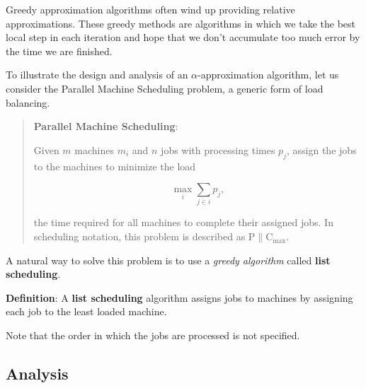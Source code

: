 \documentclass{article}
\begin{document}
Greedy approximation algorithms often wind up providing relative
approximations.  These greedy methods are algorithms in which we take
the best local step in each iteration and hope that we don't
accumulate too much error by the time we are finished.

% 
% 

To illustrate the design and analysis of an $\alpha$-approximation algorithm,
let us consider the Parallel Machine Scheduling problem, a generic form of
load balancing.

\begin{quote}
  \textbf{Parallel Machine Scheduling}:

Given $m$ machines $m_i$ and $n$ jobs with processing times $p_j$, assign the jobs to the machines
to minimize the load

$$
\max\limits_{i} \sum\limits_{j \in i} p_j,
$$

the time required for all machines to complete their assigned jobs. In scheduling notation, this
problem is described as $\mathrm {P \parallel C_{\max}}$.
\end{quote}

A natural way to solve this problem is to use a \textit{greedy algorithm} called \textbf{list
scheduling}.

\textbf{Definition}:
A \textbf{list scheduling} algorithm assigns jobs to machines by assigning each job to the least
loaded machine.

Note that the order in which the jobs are processed is not specified.

\subsection{Analysis}
\end{document}
